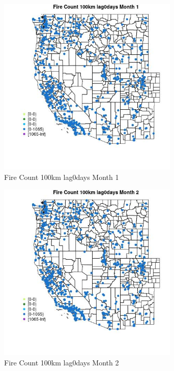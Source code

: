 \begin{figure} 
\centering  
\includegraphics[width=0.77\textwidth]{Code_Outputs/Report_ML_input_PM25_Step4_part_f_de_duplicated_aveswNAs_MapObsMo1Fire_Count_100km_lag0days.jpg} 
\caption{\label{fig:Report_ML_input_PM25_Step4_part_f_de_duplicated_aveswNAsMapObsMo1Fire_Count_100km_lag0days}Fire Count 100km lag0days Month 1} 
\end{figure} 
 

\begin{figure} 
\centering  
\includegraphics[width=0.77\textwidth]{Code_Outputs/Report_ML_input_PM25_Step4_part_f_de_duplicated_aveswNAs_MapObsMo2Fire_Count_100km_lag0days.jpg} 
\caption{\label{fig:Report_ML_input_PM25_Step4_part_f_de_duplicated_aveswNAsMapObsMo2Fire_Count_100km_lag0days}Fire Count 100km lag0days Month 2} 
\end{figure} 
 

